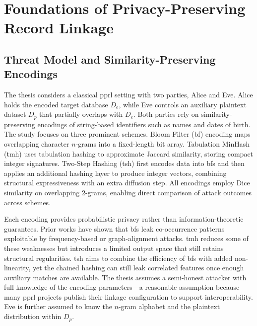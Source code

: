 \documentclass[a4paper,11pt]{scrartcl}
\begin{document}
\section{Foundations of Privacy-Preserving Record Linkage}
\subsection{Threat Model and Similarity-Preserving Encodings}
The thesis considers a classical \ac{pprl} setting with two parties, Alice and Eve. Alice holds the encoded target database $D_e$, while Eve controls an auxiliary plaintext dataset $D_p$ that partially overlaps with $D_e$. Both parties rely on similarity-preserving encodings of string-based identifiers such as names and dates of birth. The study focuses on three prominent schemes. Bloom Filter (\ac{bf}) encoding maps overlapping character $n$-grams into a fixed-length bit array. Tabulation MinHash (\ac{tmh}) uses tabulation hashing to approximate Jaccard similarity, storing compact integer signatures. Two-Step Hashing (\ac{tsh}) first encodes data into \ac{bf}s and then applies an additional hashing layer to produce integer vectors, combining structural expressiveness with an extra diffusion step. All encodings employ Dice similarity on overlapping 2-grams, enabling direct comparison of attack outcomes across schemes.

Each encoding provides probabilistic privacy rather than information-theoretic guarantees. Prior works have shown that \ac{bf}s leak co-occurrence patterns exploitable by frequency-based or graph-alignment attacks. \ac{tmh} reduces some of these weaknesses but introduces a limited output space that still retains structural regularities. \ac{tsh} aims to combine the efficiency of \ac{bf}s with added non-linearity, yet the chained hashing can still leak correlated features once enough auxiliary matches are available. The thesis assumes a semi-honest attacker with full knowledge of the encoding parameters---a reasonable assumption because many \ac{pprl} projects publish their linkage configuration to support interoperability. Eve is further assumed to know the $n$-gram alphabet and the plaintext distribution within $D_p$.
\end{document}
